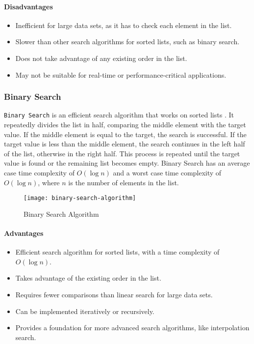\paragraph{Disadvantages}
\begin{itemize}
    \item Inefficient for large data sets, as it has to check each element in the list.
    \item Slower than other search algorithms for sorted lists, such as binary search.
    \item Does not take advantage of any existing order in the list.
    \item May not be suitable for real-time or performance-critical applications.
\end{itemize}

\subsubsection{Binary Search}
\lstinline{Binary Search} is an efficient search algorithm that works on sorted lists \cite{popovi_binary_search}. It repeatedly divides the list in half, comparing the middle element with the target value. If the middle element is equal to the target, the search is successful. If the target value is less than the middle element, the search continues in the left half of the list, otherwise in the right half. This process is repeated until the target value is found or the remaining list becomes empty. Binary Search has an average case time complexity of $O(\log n)$ and a worst case time complexity of $O(\log n)$, where $n$ is the number of elements in the list.

\begin{figure}[htbp]
    \centering
    \texttt{[image: binary-search-algorithm]}
    \caption{Binary Search Algorithm \cite{jamie_binary_search}}
    \label{fig:binary-search-algorithm}
\end{figure}

\paragraph{Advantages}
\begin{itemize}
    \item Efficient search algorithm for sorted lists, with a time complexity of $O(\log n)$.
    \item Takes advantage of the existing order in the list.
    \item Requires fewer comparisons than linear search for large data sets.
    \item Can be implemented iteratively or recursively.
    \item Provides a foundation for more advanced search algorithms, like interpolation search.
\end{itemize}
